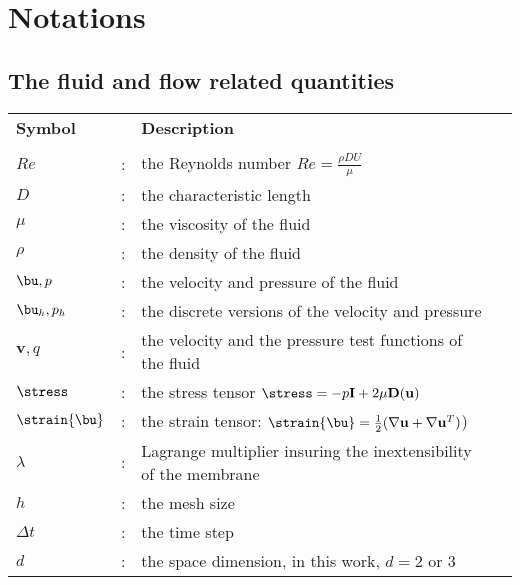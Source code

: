 \chapter*{Notations}
\section*{The fluid and flow related quantities}
\vspace{-6mm}
\begin{longtable}{lcp{}l}
  \textbf{Symbol} & & \textbf{Description} \\
   & & & \\
   $Re$ & : & the Reynolds number $Re = \frac{\rho D U}{\mu}$& \\
   $D$ & : & the characteristic length & \\
   $\mu$ & : & the viscosity of the fluid & \\
   $\rho$ & : & the density of the fluid & \\
   $\bu, p$ & : & the velocity and pressure of the fluid & \\
   $\bu_h, p_h$ & : & the discrete versions of the velocity and pressure & \\
   $\mathbf{v}, q$ & : & the velocity and the pressure test functions of the fluid & \\
   $\stress$ & : & the stress tensor $\stress = -p \mathbf{I} +2 \mu \mathbf{D}(\mathbf{u})$ &  \\
   $\strain{\bu}$ & : & the strain tensor: $\strain{\bu} = \frac{1}{2}( \nabla \mathbf{u} + \nabla \mathbf{u}^T)$) &  \\
   $\lambda$ & : & Lagrange multiplier insuring the inextensibility of the membrane & \\
   $h$ & :& the mesh size & \\
   $\Delta t$ & : & the time step & \\
   $d$ & : & the space dimension, in this work, $d=2 \text{ or } 3 $ & \\

\end{longtable}

